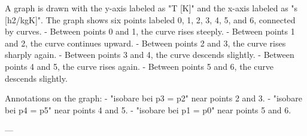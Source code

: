 A graph is drawn with the y-axis labeled as "T [K]" and the x-axis labeled as "s [h2/kgK]". The graph shows six points labeled 0, 1, 2, 3, 4, 5, and 6, connected by curves.  
- Between points 0 and 1, the curve rises steeply.  
- Between points 1 and 2, the curve continues upward.  
- Between points 2 and 3, the curve rises sharply again.  
- Between points 3 and 4, the curve descends slightly.  
- Between points 4 and 5, the curve rises again.  
- Between points 5 and 6, the curve descends slightly.  

Annotations on the graph:  
- "isobare bei p3 = p2" near points 2 and 3.  
- "isobare bei p4 = p5" near points 4 and 5.  
- "isobare bei p1 = p0" near points 5 and 6.  

---